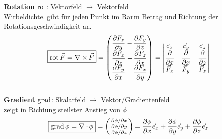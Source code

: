 \textbf{Rotation} $\operatorname{rot}$: Vektorfeld $\rightarrow$ Vektorfeld\\ 
\small{Wirbeldichte, gibt für jeden Punkt im Raum Betrag und Richtung der Rotationsgeschwindigkeit an.}
\begin{align*}
\boxed{\operatorname{rot} \vec{F} = \nabla \times \vec{F} } = 
\begin{pmatrix}
    \dfrac{\partial F_z}{\partial y} - \dfrac{\partial F_y}{\partial z} \\
    \dfrac{\partial F_x}{\partial z} - \dfrac{\partial F_z}{\partial x} \\
    \dfrac{\partial F_y}{\partial x} - \dfrac{\partial F_x}{\partial y}
\end{pmatrix} =
\begin{vmatrix}
    \vec{e}_x & \vec{e}_y & \vec{e}_z \\
    \dfrac{\partial}{\partial x} & \dfrac{\partial }{\partial x} & \dfrac{\partial }{\partial z} \\
    \vec{F}_x & \vec{F}_y & \vec{F}_z
\end{vmatrix}
\end{align*}\\

\textbf{Gradient} $\operatorname{grad}$: Skalarfeld $\rightarrow$ Vektor/Gradientenfeld\\ 
\small{zeigt in Richtung steilster Anstieg von $\phi$}
\begin{align*}                                                                                          
    \boxed{\operatorname{grad} \phi = \nabla \cdot \phi }=  
    \begin{psmallmatrix}
        \partial \phi / \partial x \\
        \partial \phi / \partial y \\
        \partial \phi / \partial z
    \end{psmallmatrix}
    = \dfrac{\partial \phi}{\partial x} \vec{e}_x + \dfrac{\partial \phi}{\partial y} \vec{e}_y + 
    \dfrac{\partial \phi}{\partial z} \vec{e}_z  
\end{align*}

